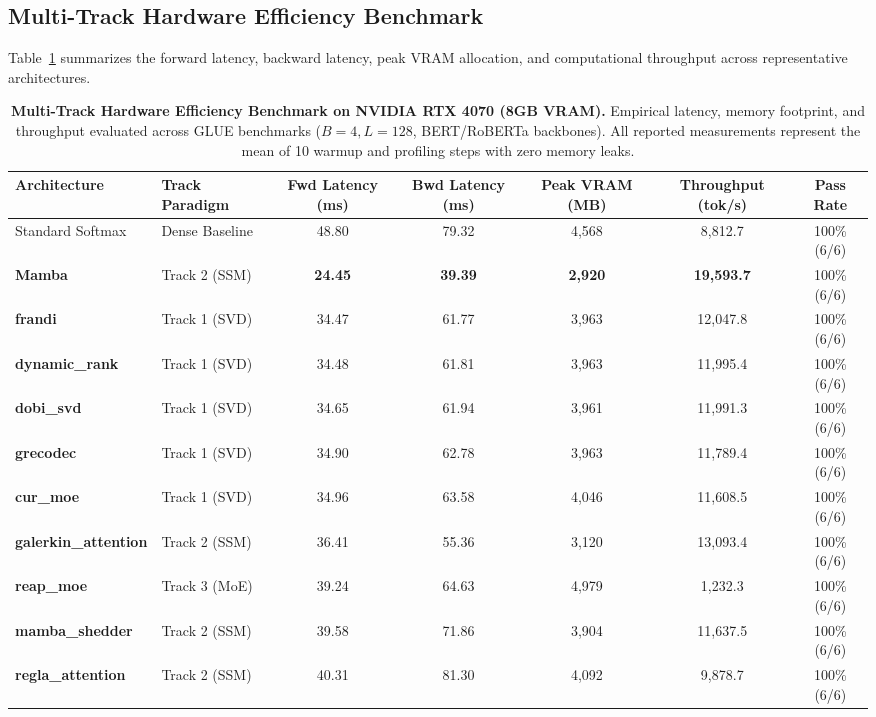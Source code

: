 \subsection{Multi-Track Hardware Efficiency Benchmark}
Table~\ref{tab:empirical_efficiency_benchmark} summarizes the forward latency, backward latency, peak VRAM allocation, and computational throughput across representative architectures.

\begin{table}[t]
\centering
\small
\caption{\textbf{Multi-Track Hardware Efficiency Benchmark on NVIDIA RTX 4070 (8GB VRAM).} Empirical latency, memory footprint, and throughput evaluated across GLUE benchmarks ($B=4, L=128$, BERT/RoBERTa backbones). All reported measurements represent the mean of 10 warmup and profiling steps with zero memory leaks.}
\label{tab:empirical_efficiency_benchmark}
\begin{tabularx}{\textwidth}{llccccc}
\toprule
\textbf{Architecture} & \textbf{Track Paradigm} & \textbf{Fwd Latency (ms)} & \textbf{Bwd Latency (ms)} & \textbf{Peak VRAM (MB)} & \textbf{Throughput (tok/s)} & \textbf{Pass Rate} \\
\midrule
Standard Softmax & Dense Baseline & 48.80 & 79.32 & 4,568 & 8,812.7 & 100\% (6/6) \\
\midrule
\textbf{Mamba} & Track 2 (SSM) & \textbf{24.45} & \textbf{39.39} & \textbf{2,920} & \textbf{19,593.7} & 100\% (6/6) \\
\textbf{frandi} & Track 1 (SVD) & 34.47 & 61.77 & 3,963 & 12,047.8 & 100\% (6/6) \\
\textbf{dynamic\_rank} & Track 1 (SVD) & 34.48 & 61.81 & 3,963 & 11,995.4 & 100\% (6/6) \\
\textbf{dobi\_svd} & Track 1 (SVD) & 34.65 & 61.94 & 3,961 & 11,991.3 & 100\% (6/6) \\
\textbf{grecodec} & Track 1 (SVD) & 34.90 & 62.78 & 3,963 & 11,789.4 & 100\% (6/6) \\
\textbf{cur\_moe} & Track 1 (SVD) & 34.96 & 63.58 & 4,046 & 11,608.5 & 100\% (6/6) \\
\textbf{galerkin\_attention} & Track 2 (SSM) & 36.41 & 55.36 & 3,120 & 13,093.4 & 100\% (6/6) \\
\textbf{reap\_moe} & Track 3 (MoE) & 39.24 & 64.63 & 4,979 & 1,232.3 & 100\% (6/6) \\
\textbf{mamba\_shedder} & Track 2 (SSM) & 39.58 & 71.86 & 3,904 & 11,637.5 & 100\% (6/6) \\
\textbf{regla\_attention} & Track 2 (SSM) & 40.31 & 81.30 & 4,092 & 9,878.7 & 100\% (6/6) \\

\end{tabularx}
\end{table}
